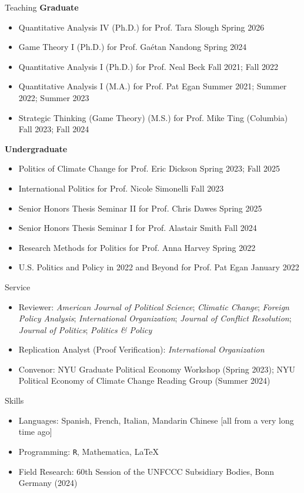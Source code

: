 \documentclass{resume} %
\begin{document}
\begin{rSection}{Teaching}
\textbf{Graduate}
\begin{itemize}
\item Quantitative Analysis IV (Ph.D.) for Prof. Tara Slough \hfill Spring 2026
\item Game Theory I (Ph.D.) for Prof. Ga\'etan Nandong \hfill Spring 2024
\item Quantitative Analysis I (Ph.D.) for Prof. Neal Beck \hfill Fall 2021; Fall 2022
\item Quantitative Analysis I (M.A.) for Prof. Pat Egan \hfill Summer 2021; Summer 2022; Summer 2023
\item Strategic Thinking (Game Theory) (M.S.) for Prof. Mike Ting (Columbia) \hfill Fall 2023; Fall 2024
\end{itemize}
\textbf{Undergraduate}
\begin{itemize}
\item Politics of Climate Change  for Prof. Eric Dickson \hfill Spring 2023; Fall 2025
\item International Politics  for Prof. Nicole Simonelli \hfill Fall 2023
\item Senior Honors Thesis Seminar II  for Prof. Chris Dawes \hfill Spring 2025
\item Senior Honors Thesis Seminar I  for Prof. Alastair Smith \hfill Fall 2024
\item Research Methods for Politics  for Prof. Anna Harvey \hfill Spring 2022
\item U.S. Politics and Policy in 2022 and Beyond  for Prof. Pat Egan \hfill January 2022
\end{itemize}
\end{rSection}


\begin{rSection}{Service}
\begin{itemize}
\item Reviewer:  \textit{American Journal of Political Science};  \textit{Climatic Change}; \textit{Foreign Policy Analysis}; \textit{International Organization}; \textit{Journal of Conflict Resolution}; \textit{Journal of Politics}; \textit{Politics \& Policy}

\item Replication Analyst (Proof Verification):  \textit{International Organization} 
\item Convenor: NYU Graduate Political Economy Workshop (Spring 2023); NYU Political Economy of Climate Change Reading Group (Summer 2024)
\end{itemize}
 \end{rSection}

\begin{rSection}{Skills}
\begin{itemize}
\item Languages: Spanish, French, Italian, Mandarin Chinese [all from a very long time ago]
\item Programming: \texttt{R}, Mathematica, \LaTeX
\item Field Research: 60th Session of the UNFCCC Subsidiary Bodies, Bonn Germany (2024) 
\end{itemize}
\end{rSection}
\end{document}
